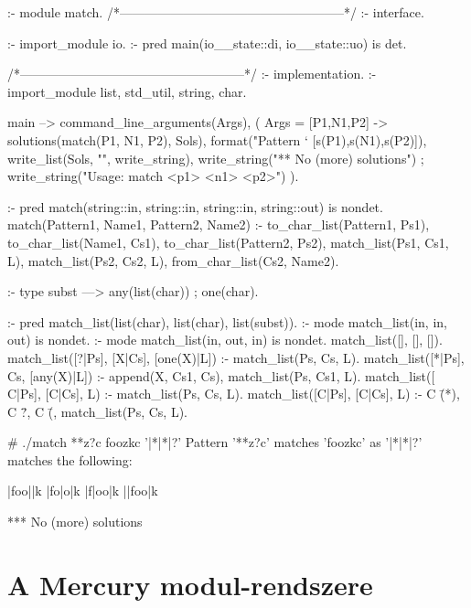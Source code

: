 \begin{prologcode}
:- module match.
/*-----------------------------------------------------*/
:- interface.

:- import_module io.
:- pred main(io__state::di, io__state::uo) is det. %

/*-----------------------------------------------------*/
:- implementation.
:- import_module list, std_util, string, char.

main --> 
    command_line_arguments(Args),
    (   {Args = [P1,N1,P2]} ->
         {solutions(match(P1, N1, P2), Sols)},
         format("Pattern `%
                         [s(P1),s(N1),s(P2)]),
         write_list(Sols, "\n", write_string),
         write_string("\n*** No (more) solutions\n")
    ;   write_string("Usage: match <p1> <n1> <p2>\n")
    ).

:- pred match(string::in, string::in, string::in,
               string::out) is nondet. %
match(Pattern1, Name1, Pattern2, Name2) :-
    to_char_list(Pattern1, Ps1),
    to_char_list(Name1, Cs1),
    to_char_list(Pattern2, Ps2),
    match_list(Ps1, Cs1, L),
    match_list(Ps2, Cs2, L),
    from_char_list(Cs2, Name2).

:- type subst ---> any(list(char)) ; one(char).

:- pred match_list(list(char), list(char), list(subst)).
:- mode match_list(in, in, out) is nondet. %
:- mode match_list(in, out, in) is nondet. %
match_list([], [], []).
match_list([?|Ps], [X|Cs], [one(X)|L]) :-
    match_list(Ps, Cs, L).
match_list([*|Ps], Cs, [any(X)|L]) :-
    append(X, Cs1, Cs),
    match_list(Ps, Cs1, L).
match_list([\, C|Ps],  [C|Cs], L) :-
    match_list(Ps, Cs, L).
match_list([C|Ps], [C|Cs], L) :-
    C \= (*), C \= ?, C \= (\), 
    match_list(Ps, Cs, L).
\end{prologcode}

\begin{prologcode}
# ./match **z?c  foozkc '|*|*|?'
Pattern '**z?c' matches 'foozkc' as '|*|*|?' matches the following:

    |foo||k
    |fo|o|k
    |f|oo|k
    ||foo|k

*** No (more) solutions
\end{prologcode}

\section{A Mercury modul-rendszere}

